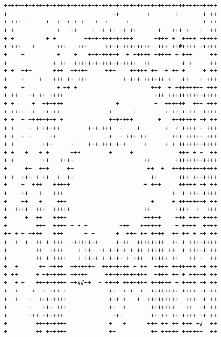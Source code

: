 \begin{Verbatim}[samepage=true]
+++++++++++++++++++++++++++++++++++++++++++++++++++++++++++++
+                              ++        +       +       + ++
+ +++  +    +  +  +++ +   ++ +     +                     + ++
+ +            +   ++    + ++ ++ ++ ++      +   +++ +   +  ++
+ +         + +        ++++++++++++++      ++++ +  ++++ +++++
+ +++   +      +++   +++     +++++++++++++  +++ ++#++++ +++++
+    +         +    +   +++++++++  + +++++ +++++ + +++     ++
+             + ++  ++++++++++++++++++  ++         + +     ++
+ +  +++      +++  +++++     +++    +++++ ++  + ++ +     + ++
+    +    +   +++ ++ +++          + +++ ++++++ +   ++   + +++
+    +         + ++ +                     +++  + ++++++++ +++
+ ++   ++ ++ ++++                          +++ ++++++++++++++
+ +     +  ++++++               +          +  ++++++  +++ +++
+ ++++ ++  +++++              +  +   +        + ++ + ++ +++++
+ +  + ++++++++ +             +++++++       +   +++++++ ++ ++
+ +    + + +++++        +++++++  +    +       +  + ++++ + +++
+ +  + +     ++               +  + +++ ++       +++ +++++ +++
+ +        +++     +    +++++++ +++     +     + + +++++++++++
+ +   +   + +      +++        +     +             +++ + +  ++
+ +        ++   ++++                    ++       ++++++++++++
+     ++  +++     ++                     ++  +  +++++++++++++
+ +  +++ + ++  +  ++                      ++      +++ +++++++
+    +  +++   +++++                     + +++     +++++ ++ ++
+    ++   +   +++                               +  + +++ ++++
+    ++   +    +++                        +     + ++++++++ ++
+  ++++  +++  +++++                     ++       ++++  +  +++
+     +  ++   ++++                      +++++    +++ +++ ++++
+        +++  ++++ + + +         +++   ++++++    + ++++  ++++
++ + + ++++   +++      + +      +  +++ ++ ++++  ++ ++ + ++ ++
+  +  +  ++ + +++  +++++++++    ++++  ++++++++  ++ + ++++++++
+        ++  ++++    + +++ ++ +++++ + ++ +++++ ++  + +++++ ++
+        ++ + ++++   + ++++ + ++++ + +++  +++++ ++   ++ +  ++
+  +      ++ ++++  +++++++  ++++++++ + ++  ++++ +++++++ ++ ++
+ ++     + +++++++ +++++     ++++++++++++  ++++ ++ + +++++ ++
+  + +   +++++++++ ++##++  + ++++ +++++++ ++++++ + ++++ ++ ++
+  +    +  + +++ +            ++  + +  +  ++++++++ ++++ ++ ++
+  +   +  ++++++++            +++ +   +  +++++++++  +++  + ++
+      +   +++ +++            ++  +       +++++++   ++  ++ ++
+      +++ ++++++              +++        ++ ++ ++ ++++ ++ ++
+        +++++++++            +   +      +++ ++ ++ +++ +#  ++
+        ++ ++++++            ++          ++ +++++ ++++++  ++

\end{Verbatim}
